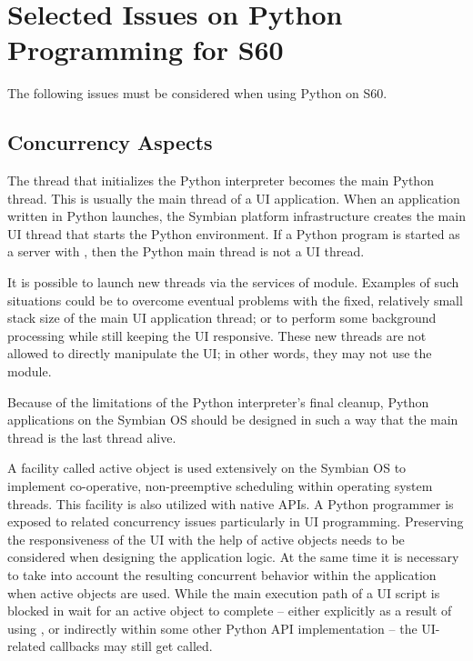%
%
%

\chapter{Selected Issues on Python Programming for S60}
\label{sec:selected}

The following issues must be considered when using Python on S60.

\section{Concurrency Aspects}
\label{subsec:concurrency}
The thread that initializes the Python interpreter becomes the main Python 
thread. This is usually the main thread of a UI application. When an 
application written in Python launches, the Symbian platform infrastructure 
creates the main UI thread that starts the Python environment. If a Python 
program is started as a server with , then the 
Python main thread is not a UI thread.

It is possible to launch new threads via the services of  
module. Examples of such situations could be to overcome eventual problems 
with the fixed, relatively small stack size of the main UI application 
thread; or to perform some background processing while still keeping the UI 
responsive. These new threads are not allowed to directly manipulate the UI; 
in other words, they may not use the  module.

Because of the limitations of the Python interpreter's final cleanup, Python 
applications on the Symbian OS should be designed in such a way that the 
main thread is the last thread alive.

A facility called active object is used extensively on the Symbian OS to 
implement co-operative, non-preemptive scheduling within operating system 
threads. This facility is also utilized with native APIs. A Python 
programmer is exposed to related concurrency issues particularly in UI 
programming. Preserving the responsiveness of the UI with the help of active 
objects needs to be considered when designing the application logic. At the 
same time it is necessary to take into account the resulting concurrent 
behavior within the application when active objects are used. While the main 
execution path of a UI script is blocked in wait for an active object to 
complete -- either explicitly as a result of using , 
or indirectly within some other Python API implementation -- the UI-related 
callbacks may still get called.

